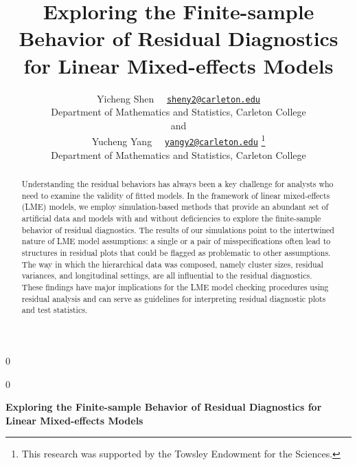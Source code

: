 \documentclass[12pt]{article}
\newcommand{\blind}{0}
\begin{document}
\def\spacingset#1{\renewcommand{\baselinestretch}%
{#1}\small\normalsize} \spacingset{1}



\blind
{
  \title{\bf Exploring the Finite-sample Behavior of Residual
Diagnostics for Linear Mixed-effects Models}

  \author{
        Yicheng Shen
~~\href{mailto:sheny2@carleton.edu}{\nolinkurl{sheny2@carleton.edu}} \\
    Department of Mathematics and Statistics, Carleton College\\
     and \\     Yucheng Yang
~~\href{mailto:yangy2@carleton.edu}{\nolinkurl{yangy2@carleton.edu}} \thanks{This
research was supported by the Towsley Endowment for the Sciences.} \\
    Department of Mathematics and Statistics, Carleton College\\
      }
  \maketitle
} \fi

\blind
{
  \bigskip
  \bigskip
  \bigskip
  \begin{center}
    {\LARGE\bf Exploring the Finite-sample Behavior of Residual
Diagnostics for Linear Mixed-effects Models}
  \end{center}
  \medskip
} \fi

\bigskip
\begin{abstract}
Understanding the residual behaviors has always been a key challenge for
analysts who need to examine the validity of fitted models. In the
framework of linear mixed-effects (LME) models, we employ
simulation-based methods that provide an abundant set of artificial data
and models with and without deficiencies to explore the finite-sample
behavior of residual diagnostics. The results of our simulations point
to the intertwined nature of LME model assumptions: a single or a pair
of misspecifications often lead to structures in residual plots that
could be flagged as problematic to other assumptions. The way in which
the hierarchical data was composed, namely cluster sizes, residual
variances, and longitudinal settings, are all influential to the
residual diagnostics. These findings have major implications for the LME
model checking procedures using residual analysis and can serve as
guidelines for interpreting residual diagnostic plots and test
statistics.\\
\hspace*{0.333em}
\end{abstract}
\end{document}
